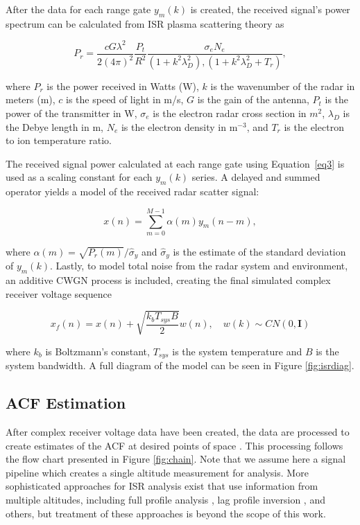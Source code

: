 \documentclass[draft,ras]{agutex}
\begin{document}
\begin{article}
After the data for each range gate $y_m(k)$ is created, the received signal's power spectrum can be calculated from ISR plasma scattering theory as 

\begin{equation}
\label{eq3}
P_r = \frac{cG \lambda^2}{2(4\pi)^2}\frac{P_t }{R^2}\frac{\sigma_e N_e}{(1+k^2\lambda_D^2),(1+k^2\lambda_D^2 + T_r)},
\end{equation}
 
 \noindent where $P_r$ is the power received in Watts (W), $k$ is the wavenumber of the radar in meters (m), $c$ is the speed of light in m/s, $G$ is the gain of the antenna, $P_t$ is the power of the transmitter in W, $\sigma_e$ is the electron radar cross section in $m^2$,  $\lambda_D$ is the Debye length in m, $N_e$ is the electron density in m$^{-3}$, and $T_r$ is the electron to ion temperature ratio.
  
The received signal power calculated at each range gate using Equation~\ref{eq3} is used as a scaling constant for each $y_m(k)$ series.  A delayed and summed operator yields a model of the received radar scatter signal:
 
\begin{equation}
\label{eq4}
x(n) = \displaystyle\sum\limits_{m =0}^{M-1} \alpha(m)y_m(n-m),
\end{equation}

\noindent where $\alpha(m) = \sqrt{P_r(m)}/\widehat{\sigma}_y$ and $\widehat{\sigma}_y$ is the estimate of the standard deviation of $y_m(k)$. Lastly, to model total noise from the radar system and environment, an additive CWGN process is included, creating the final simulated complex receiver voltage sequence

\begin{equation}
\label{eq:addnoise}
x_f(n) = x(n) +\sqrt{\frac{k_bT_{sys}B}{2}} w(n), \quad w(k)\sim CN(0,\mathbf{I})
\end{equation}

\noindent where $k_b$ is Boltzmann's constant, $T_{sys}$ is the system temperature and $B$ is the system bandwidth.
A full diagram of the model can be seen in Figure \ref{fig:isrdiag}.


\subsection{ACF Estimation}
\label{sec:acf}
After complex receiver voltage data have been created, the data are processed to create estimates of the ACF at desired points of space \citep[see, e.g.,][]{farley1969,nygren1996}. This processing follows the flow chart presented in Figure \ref{fig:chain}.  Note that we assume here a signal pipeline which creates a single altitude measurement for analysis.  More sophisticated approaches for ISR analysis exist that use information from multiple altitudes, including full profile analysis \citep{RDS:RDS3308}, lag profile inversion \citep{Virtanen:20082vx}, and others, but treatment of these approaches is beyond the scope of this work.


\end{article}
\end{document}

